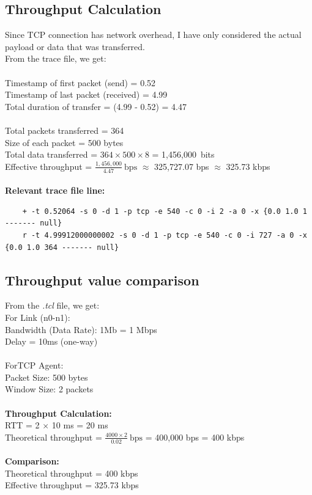 \documentclass[12pt]{article}
\begin{document}
	\subsection{Throughput Calculation}
	Since TCP connection has network overhead, I have only considered the actual payload or data that was transferred. \\
	From the trace file, we get: \\
	\\
	Timestamp of first packet (send) = 0.52 \\
	Timestamp of last packet (received) = 4.99 \\
	Total duration of transfer = (4.99 - 0.52) = 4.47 \\
	\\
	Total packets transferred = 364 \\
	Size of each packet = 500 bytes \\
	Total data transferred = $364\times500\times8$ = 1,456,000 bits
	\\
	Effective throughput = $\frac{1,456,000}{4.47}~\mathrm{bps}$ $\approx$ 325,727.07 bps $\approx$ 325.73 kbps
	\\
	\noindent
	\\
	\textbf{Relevant trace file line:}
	\begin{lstlisting}
	+ -t 0.52064 -s 0 -d 1 -p tcp -e 540 -c 0 -i 2 -a 0 -x {0.0 1.0 1 ------- null}
	r -t 4.99912000000002 -s 0 -d 1 -p tcp -e 540 -c 0 -i 727 -a 0 -x {0.0 1.0 364 ------- null}
	\end{lstlisting}
	
	
	\subsection{Throughput value comparison}
	From the \textit{.tcl} file, we get: \\
	For Link (n0-n1): \\
	Bandwidth (Data Rate): 1Mb = 1 Mbps \\
	Delay = 10ms (one-way) \\
	\\
	\noindent
	ForTCP Agent: \\
	Packet Size: 500 bytes \\
	Window Size: 2 packets \\
	\\
	\noindent
	\textbf{Throughput Calculation:} \\
	RTT = 2 $\times$ 10 ms = 20 ms \\
	Theoretical throughput = $\frac{4000\times2}{0.02}~\mathrm{bps}$ = 400,000 bps = 400 kbps\\
	\\
	\textbf{Comparison:} \\
	Theoretical throughput = 400 kbps \\
	Effective throughput = 325.73 kbps
	
\end{document}
